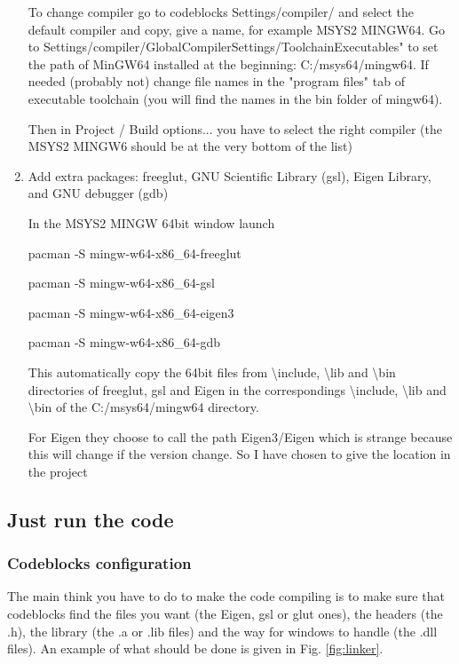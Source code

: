 \documentclass[amsmath,amssymb,nofootinbib]{revtex4-2}
\begin{document}
\begin{enumerate}
To change compiler go to codeblocks Settings/compiler/ and select the default compiler and copy, give a name, for example MSYS2 MINGW64.
	Go to Settings/compiler/GlobalCompilerSettings/ToolchainExecutables" to set the path of MinGW64 installed at the beginning: C:/msys64/mingw64. If needed (probably not) change 
file names in the "program files" tab of executable toolchain (you will find  the names in the bin folder of mingw64).
	
Then in Project / Build options... you have to select the right compiler (the MSYS2 MINGW6 should be at the very bottom of the list)
	

\item Add extra packages: freeglut, GNU Scientific Library (gsl), Eigen Library, and GNU debugger (gdb)



In the
MSYS2 MINGW 64bit window launch

pacman -S mingw-w64-x86\_64-freeglut

pacman -S mingw-w64-x86\_64-gsl

pacman -S mingw-w64-x86\_64-eigen3

 pacman -S mingw-w64-x86\_64-gdb

This automatically copy the 64bit files from \textbackslash{}include, \textbackslash{}lib and \textbackslash{}bin  directories of freeglut, gsl and Eigen in the correspondings \textbackslash{}include, \textbackslash{}lib and \textbackslash{}bin of the  C:/msys64/mingw64 directory.

For Eigen they choose to call the path Eigen3/Eigen which is strange because this will change if the version change. So I have chosen to give the location in the project

\end{enumerate}


\subsection{Just run the code}

\subsubsection{Codeblocks configuration}
The main think you have to do to make the code compiling is to make sure that codeblocks find the  files you want (the Eigen, gsl or glut ones), the headers (the .h), the library (the .a or .lib files) and the way for windows to handle  (the .dll files).
An example of what should be done is given in Fig. \ref{fig:linker}. 
\end{document}
